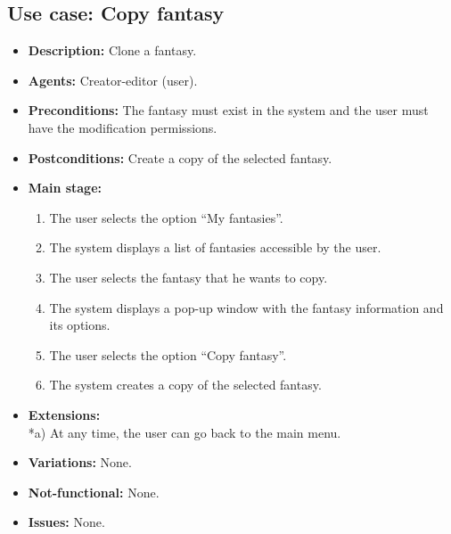 \subsection{Use case: Copy fantasy}
\begin{itemize}
	\item \textbf{Description:} Clone a fantasy.
	\item \textbf{Agents:} Creator-editor (user).
	\item \textbf{Preconditions:} The fantasy must exist in the system and the user must have the modification permissions.
	\item \textbf{Postconditions:} Create a copy of the selected fantasy.
	\item \textbf{Main stage:}
	\begin{enumerate}
		\item The user selects the option ``My fantasies''.
		\item The system displays a list of fantasies accessible by the user.
		\item The user selects the fantasy that he wants to copy.
		\item The system displays a pop-up window with the fantasy information and its options.
		\item The user selects the option ``Copy fantasy''.
		\item The system creates a copy of the selected fantasy.
	\end{enumerate}
	\item \textbf{Extensions:} \\ *a) At any time, the user can go back to the main menu.
	\item \textbf{Variations:} None.
	\item \textbf{Not-functional:} None.
	\item \textbf{Issues:} None.
\end{itemize}

